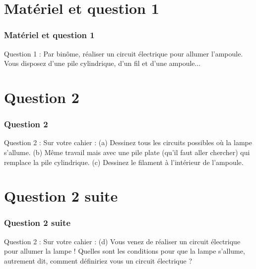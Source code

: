 \documentclass{beamer}
\begin{document}
\section{Matériel et question 1}
\begin{frame}
\frametitle{Matériel et question 1}
Question 1 : Par binôme, réaliser un circuit électrique pour allumer l’ampoule. Vous disposez d’une
pile cylindrique, d’un fil et d’une ampoule...
\end{frame}


\section{Question 2}
\begin{frame}
\frametitle{Question 2}
Question 2 : Sur votre cahier :
(a) Dessinez tous les circuits possibles où la lampe s’allume.
(b) Même travail mais avec une pile plate (qu’il faut aller chercher) qui remplace la pile cylindrique.
(c) Dessinez le filament à l’intérieur de l’ampoule.
\end{frame}

\section{Question 2 suite}
\begin{frame}
\frametitle{Question 2 suite}
Question 2 : Sur votre cahier :
(d) Vous venez de réaliser un circuit électrique pour allumer la lampe ! Quelles sont les conditions pour
que la lampe s’allume, autrement dit, comment définiriez vous un circuit électrique ?
\end{frame}








\end{document}
